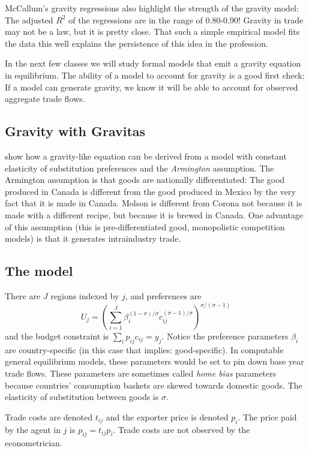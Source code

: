 \documentclass[11pt, pdftex]{article}
\begin{document}
McCallum's gravity regressions also highlight the strength of the gravity model: The adjusted $R^2$ of the regressions are in the range of 0.80-0.90! Gravity in trade may not be a law, but it is pretty close.  That such a simple empirical model fits the data this well explains the persistence of this idea in the profession.

In the next few classes we will study formal models that emit a gravity equation in equilibrium.  The ability of a model to account for gravity is a good first check: If a model can generate gravity, we know it will be able to account for observed aggregate trade flows.

\subsection*{Gravity with Gravitas}
 \citet{andersonVanwin} show how a gravity-like equation can be derived from a model with constant elasticity of substitution preferences and the \textit{Armington} assumption.  The Armington assumption is that goods are nationally differentiated: The good produced in Canada is different from the good produced in Mexico by the very fact that it is made in Canada.  Molson is different from Corona not because it is made with a different recipe, but because it is brewed in Canada. One advantage of this assumption (this is pre-differentiated good, monopolistic competition models) is that it generates intraindustry trade.

\subsection*{The model}
There are $J$ regions indexed by $j$, and preferences are
\begin{equation}
U_j =\left(\sum_{i=1}^J \beta_i^{(1-\sigma)/\sigma}c_{ij}^{(\sigma-1)/\sigma}\right)^{\sigma/(\sigma-1)}
\end{equation}
and the budget constraint is $\sum_i p_{ij} c_{ij}=y_j$.  Notice the preference parameters $\beta_i$ are country-specific (in this case that implies: good-specific).  In computable general equilibrium models, these parameters would be set to pin down base year trade flows.  These parameters are sometimes called \textit{home bias} parameters because countries' consumption baskets are skewed towards domestic goods.  The elasticity of substitution between goods is $\sigma$.

Trade costs are denoted $t_{ij}$ and the exporter price is denoted $p_i$.  The price paid by the agent in $j$ is $p_{ij}=t_{ij}p_i$.  Trade costs are not observed by the econometrician.
\end{document}

